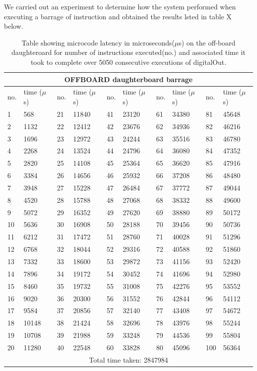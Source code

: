 We carried out an experiment to determine how the system performed when executing a barrage of instruction and obtained the results lsted in table X below. 
\begin{table}
	\centering
	\caption{Table showing microcode latency in microseconds($\mu$s) on the off-board daughteroard for number of instructions executed(no.) and associated time it took to complete over 5050 consecutive executions of digitalOut.}
	
	\begin{tabular}{|l|l||l|l||l|l||l|l||l|l||}
	\toprule
 \multicolumn{10}{c}{\textbf{OFFBOARD daughterboard barrage}} \\\hline


no. & time ($\mu$s)& no. & time ($\mu$s)& no. & time ($\mu$s)& no. & time ($\mu$s)& no. & time ($\mu$s) \\\hline
1 & 568 & 21 & 11840 & 41 & 23120 & 61 & 34380 & 81 & 45648 \\\hline
2 & 1132 & 22 & 12412 & 42 & 23676 & 62 & 34936 & 82 & 46216 \\\hline
3 & 1696 & 23 & 12972 & 43 & 24244 & 63 & 35516 & 83 & 46780 \\\hline
4 & 2268 & 24 & 13524 & 44 & 24796 & 64 & 36080 & 84 & 47352 \\\hline
5 & 2820 & 25 & 14108 & 45 & 25364 & 65 & 36620 & 85 & 47916 \\\hline
6 & 3384 & 26 & 14656 & 46 & 25932 & 66 & 37208 & 86 & 48480 \\\hline
7 & 3948 & 27 & 15228 & 47 & 26484 & 67 & 37772 & 87 & 49044 \\\hline
8 & 4520 & 28 & 15788 & 48 & 27068 & 68 & 38332 & 88 & 49600 \\\hline
9 & 5072 & 29 & 16352 & 49 & 27620 & 69 & 38880 & 89 & 50172 \\\hline
10 & 5636 & 30 & 16908 & 50 & 28188 & 70 & 39456 & 90 & 50736 \\\hline
11 & 6212 & 31 & 17472 & 51 & 28760 & 71 & 40028 & 91 & 51296 \\\hline
12 & 6768 & 32 & 18044 & 52 & 29316 & 72 & 40588 & 92 & 51860 \\\hline
13 & 7332 & 33 & 18600 & 53 & 29872 & 73 & 41156 & 93 & 52420 \\\hline
14 & 7896 & 34 & 19172 & 54 & 30452 & 74 & 41696 & 94 & 52980 \\\hline
15 & 8460 & 35 & 19732 & 55 & 31008 & 75 & 42276 & 95 & 53552 \\\hline
16 & 9020 & 36 & 20300 & 56 & 31552 & 76 & 42844 & 96 & 54112 \\\hline
17 & 9584 & 37 & 20856 & 57 & 32140 & 77 & 43408 & 97 & 54672 \\\hline
18 & 10148 & 38 & 21424 & 58 & 32696 & 78 & 43976 & 98 & 55244 \\\hline
19 & 10708 & 39 & 21988 & 59 & 33248 & 79 & 44536 & 99 & 55804 \\\hline
20 & 11280 & 40 & 22548 & 60 & 33828 & 80 & 45096 & 100 & 56364 \\\hline
\multicolumn{10}{c}{Total time taken: 2847984} \\\hline
\end{tabular}
\end{table}
